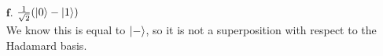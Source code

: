 \documentclass[11pt]{article}
\def\srtt{\ensuremath\frac{1}{\sqrt{2}}}
\begin{document}
\begin{enumerate}
\item[$\textbf{f.}$] $\srtt(\ket{0} - \ket{1})$ \\
	We know this is equal to $\ket{-}$, so it is not a superposition with respect 
		to the Hadamard basis.
\end{enumerate}
\end{document}
